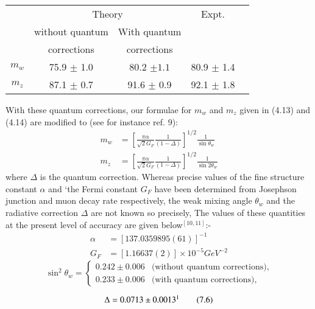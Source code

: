{\begin{center}
\begin{tabular}{|c|c|c|c|c|}
\hline
&\multicolumn{2}{c|}{Theory} &\multirow{1}{*}{Expt.}\\
\cline{2-3}
& {\rm without quantum } &{\rm With quantum } & \\
& {\rm corrections} &{\rm corrections} & \\
\hline
$m_{w}$ & 75.9 $\pm$ 1.0 & 80.2 $\pm 1.1$ & 80.9 $\pm$ 1.4 \\
$m_{z}$ & 87.1 $\pm$ 0.7 & 91.6 $\pm$ 0.9 & 92.1 $\pm$ 1.8\\
\hline
\end{tabular}
\end{center}

With these quantum corrections, our formulae for $m_{w}$ and $m_{z}$ given in (4.13) and (4.14) are
modified to (see for instance ref. 9): 
\begin{align*}
m_{w} & = \left[\frac{\pi \alpha}{\sqrt{2}G_{F}} \frac{1}{(1-\Delta)} \right]^{1/2}\frac{1}{\sin \theta_{w}}\tag{7.1}\\
m_{z} & = \left[\frac{\pi \alpha}{\sqrt{2}G_{F}} \frac{1}{(1-\Delta)} \right]^{1/2}\frac{1}{\sin 2\theta_{w}}\tag{7.2}
\end{align*}
where $\Delta$ is the quantum correction. Whereas precise values of the fine structure constant $\alpha$ and
‘the Fermi constant $G_{F}$ have been determined from Josephson junction and muon decay rate
respectively, the weak mixing angle $\theta_{w}$ and the radiative correction $\Delta$ are not known so precisely, The values of these quantities at the present level of accuracy are given below$^{[10, 11]}$:- 
\begin{align*}
\alpha &= [137.0359895(61)]^{-1}\tag{7.3}\\
G_{F}& = [1.16637(2)] \times 10^{-5} GeV^{-2}\tag{7.4}
\end{align*}
\begin{equation*}
\sin^{2} \theta_{w}=
\begin{cases}
0.242 \pm 0.006 & \text{(without quantum corrections)},\\
0.233 \pm 0.006 & \text{(with quantum corrections),}\tag{7.5}
\end{cases}
\end{equation*}

\begin{equation*}
\Delta = 0.0713 \pm 0.0013{\footnote{Actuatly the valuc of $\Delta$ depends on racy unknown parameters; see ref,[9]. }}\tag{7.6}
\end{equation*}

}
